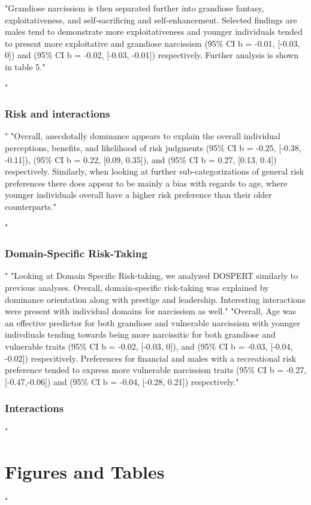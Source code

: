 \documentclass[
"  donotrepeattitle,doc, 12pt, a4paper,floatsintext]{apa7}"
\begin{document}
"Grandiose narcissism is then separated further into grandiose fantasy, exploitativeness, and self-sacrificing and self-enhancement. Selected findings are males tend to demonstrate more exploitativeness and younger individuals tended to present more exploitative and grandiose narcissism (95\% CI b = -0.01, {[}-0.03, 0{]}) and (95\% CI b = -0.02, {[}-0.03, -0.01{]}) respectively. Further analysis is shown in table 5."
\hypertarget{risk-and-interactions}{%
"\subsubsection{Risk and interactions}\label{risk-and-interactions}}"
"Overall, anecdotally dominance appears to explain the overall individual perceptions, benefits, and likelihood of risk judgments (95\% CI b = -0.25, {[}-0.38, -0.11{]}), (95\% CI b = 0.22, {[}0.09, 0.35{]}), and (95\% CI b = 0.27, {[}0.13, 0.4{]}) respectively. Similarly, when looking at further sub-categorizations of general risk preferences there does appear to be mainly a bias with regards to age, where younger individuals overall have a higher risk preference than their older counterparts."
\hypertarget{domain-specific-risk-taking-1}{%
"\subsubsection{Domain-Specific Risk-Taking}\label{domain-specific-risk-taking-1}}"
"Looking at Domain Specific Risk-taking, we analyzed DOSPERT similarly to previous analyses. Overall, domain-specific risk-taking was explained by dominance orientation along with prestige and leadership. Interesting interactions were present with individual domains for narcissism as well."
"Overall, Age was an effective predictor for both grandiose and vulnerable narcissism with younger indivdiuals tending towards being more narcissitic for both grandiose and vulnerable traits (95\% CI b = -0.02, {[}-0.03, 0{]}), and (95\% CI b = -0.03, {[}-0.04, -0.02{]}) respecitively. Preferences for financial and males with a recreational risk preference tended to express more vulnerable narcissism traits (95\% CI b = -0.27, {[}-0.47,-0.06{]}) and (95\% CI b = -0.04, {[}-0.28, 0.21{]}) respectively."
\hypertarget{interactions-1}{%
\subsubsection{Interactions}\label{interactions-1}}
\newpage
\hypertarget{figures-and-tables}{%
"\section{Figures and Tables}\label{figures-and-tables}}"
\end{document}
